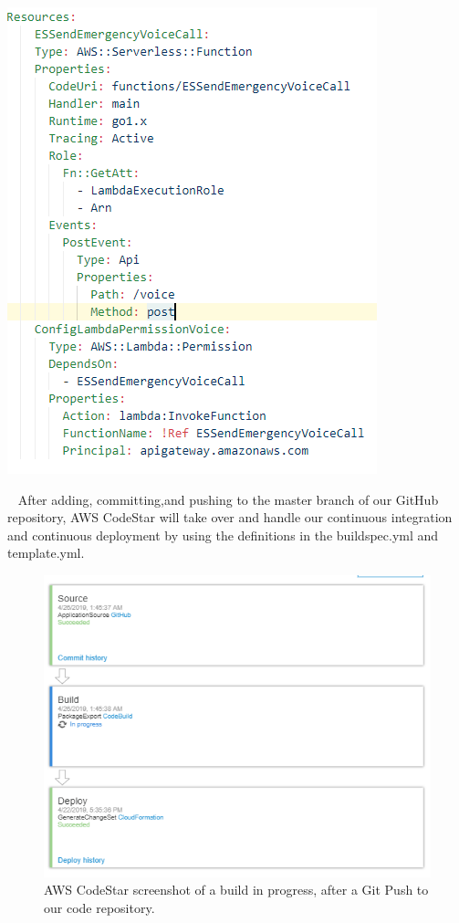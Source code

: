\documentclass[10pt, a4paper]{article}
\begin{document}
\begin{enumerate}
	\begin{center}
		\includegraphics[scale=1]{code-screenshots/deploy-template.PNG}
	\end{center}
\end{enumerate}

\par ~ After adding, committing,and pushing to the master branch of our GitHub repository, AWS CodeStar will take over and handle our continuous integration and continuous deployment by using the definitions in the buildspec.yml and template.yml.

\begin{figure}[H]
\begin{center}
  \includegraphics[scale=1]{build-in-progress.PNG}
  \caption{AWS CodeStar screenshot of a build in progress, after a Git Push to our code repository.}
\end{center}
\end{figure}
\end{document}
